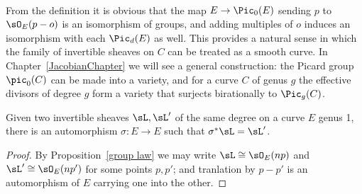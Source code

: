 \
\begin{remark}
From the definition it is obvious that 
the map
$E \to \Pic_0(E)$ sending $p$ to $\sO_E(p-o)$ is an isomorphism of groups, and adding multiples of $o$
induces an isomorphism with each $\Pic_d(E)$ as well. This provides a natural sense
in which the family of invertible sheaves on $C$ can be treated as a smooth curve.
 In Chapter~\ref{JacobianChapter} we will see a general construction: the Picard group $\pic_0(C)$ can be made into
a variety, and for a curve $C$ of genus $g$ the effective divisors
of degree $g$ form a variety that surjects birationally to $\Pic_g(C)$. 
\end{remark}
 
%

\begin{corollary}\label{equivalence of sheaves}
Given two invertible sheaves $\sL, \sL'$ of the same degree on a curve $E$ genus 1, there is an automorphism $\sigma: E\to E$
such that $\sigma^*\sL = \sL'$.
\end{corollary}

\begin{proof}
By Proposition~\ref{group law} we may write $\sL \cong \sO_E(np)$ and $\sL'\cong \sO_E(np')$ for some points $p,p'$; and tranlation by $p-p'$
is an automorphism of $E$ carrying one into the other.
\end{proof}


